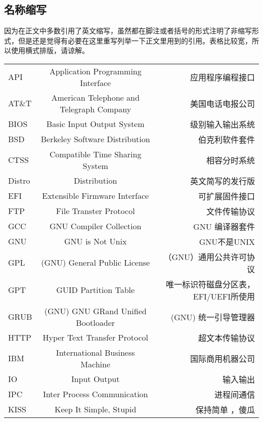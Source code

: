 

\begin{landscape}
{
\renewcommand{\clearpage}{}
\renewcommand{\newpage}{}
\chapter{名称缩写}
}

{
因为在正文中多数引用了英文缩写，虽然都在脚注或者括号的形式注明了非缩写形式，但是还是觉得有必要在这里重写列举一下正文里用到的引用。表格比较宽，所以使用横式排版，请谅解。
}
\begin{center}







\begin{supertabular}{l|c|r}
API & Application Programming Interface & 应用程序编程接口 \\
AT\&T & American Telephone and Telegraph Company & 美国电话电报公司\\
BIOS & Basic Input Output System & 级别输入输出系统\\
BSD & Berkeley Software Distribution & 伯克利软件套件 \\
CTSS & Compatible Time Sharing System & 相容分时系统 \\
Distro & Distribution & 英文简写的发行版 \\
EFI & Extensible Firmware Interface & 可扩展固件接口 \\
FTP & File Transter Protocol & 文件传输协议 \\
GCC & GNU Compiler Collection & GNU 编译器套件 \\
GNU & GNU is Not Unix & GNU不是UNIX \\
GPL & (GNU) General Public License & （GNU）通用公共许可协议 \\
GPT & GUID Partition Table & 唯一标识符磁盘分区表，EFI/UEFI所使用\\
GRUB & (GNU) GNU GRand Unified Bootloader & (GNU) 统一引导管理器 \\
HTTP & Hyper Text Transfer Protocol & 超文本传输协议 \\
IBM & International Business Machine & 国际商用机器公司 \\
IO & Input Output & 输入输出 \\
IPC & Inter Process Communication & 进程间通信 \\
KISS & Keep It Simple, Stupid& 保持简单 ，傻瓜 \\


\end{supertabular}
\end{center}
\end{landscape}
